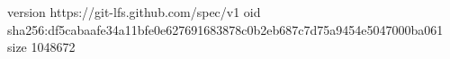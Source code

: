 version https://git-lfs.github.com/spec/v1
oid sha256:df5cabaafe34a11bfe0e627691683878c0b2eb687c7d75a9454e5047000ba061
size 1048672
